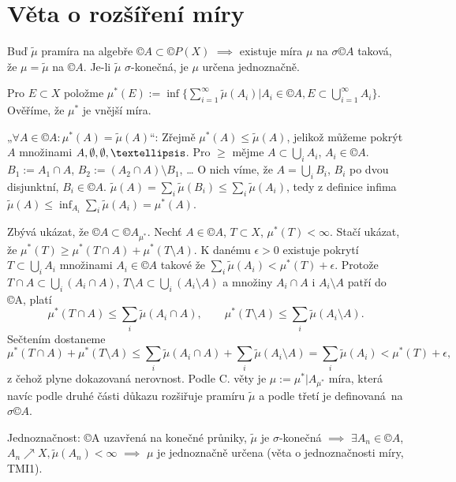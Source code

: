 \documentclass[12pt]{article}					%
\begin{document}
\section{Věta o rozšíření míry}
\begin{veta}
	Buď $\tilde{\mu}$ pramíra na algebře $©A \subset ©P(X)$ $\implies$ existuje míra $\mu$ na $\sigma©A$ taková, že $\mu = \tilde{\mu}$ na $©A$. Je-li $\tilde{\mu}$ $\sigma$-konečná, je $\mu$ určena jednoznačně.

	\begin{dukazin}
		Pro $E \subset X$ položme $\mu^*(E) := \inf\{\sum_{i=1}^∞ \tilde{\mu}(A_i) | A_i \in ©A, E \subset \bigcup_{i=1}^∞A_i\}$. Ověříme, že $\mu^*$ je vnější míra.

		„$\forall A \in ©A: \mu^*(A) = \tilde{\mu}(A)$“: Zřejmě $\mu^*(A) ≤ \tilde{\mu}(A)$, jelikož můžeme pokrýt $A$ množinami $A, \O, \O, …$. Pro $≥$ mějme $A \subset \bigcup_i A_i$, $A_i \in ©A$. $B_1:= A_1 \cap A$, $B_2 := (A_2 \cap A) \setminus B_1$, … O nich víme, že $A = \bigcup_i B_i$, $B_i$ po dvou disjunktní, $B_i \in ©A$. $\tilde{\mu}(A) = \sum_i\tilde{\mu}(B_i) ≤ \sum_i\tilde{\mu}(A_i)$, tedy z definice infima $\tilde{\mu}(A) ≤ \inf_{A_i}\sum_i \tilde{\mu}(A_i) = \mu^*(A)$.

		Zbývá ukázat, že $©A \subset ©A_{\mu^*}$. Nechť $A \in ©A$, $T \subset X$, $\mu^*(T) < ∞$. Stačí ukázat, že $\mu^*(T) ≥ \mu^*(T \cap A) + \mu^*(T \setminus A)$. K danému $\epsilon > 0$ existuje pokrytí $T \subset \bigcup_i A_i$ množinami $A_i \in ©A$ takové že $\sum_i \tilde \mu(A_i) < \mu^*(T) + \epsilon$. Protože $T \cap A \subset \bigcup_i(A_i \cap A)$, $T \setminus A \subset \bigcup_i(A_i \setminus A)$ a množiny $A_i \cap A$ i $A_i \setminus A$ patří do ©A, platí
		$$ \mu^*(T \cap A) ≤ \sum_i \tilde \mu(A_i \cap A), \qquad \mu^*(T \setminus A) ≤ \sum_i \tilde \mu(A_i \setminus A). $$
		Sečtením dostaneme
		$$ \mu^*(T \cap A) + \mu^*(T \setminus A) ≤ \sum_i \tilde \mu(A_i \cap A) + \sum_i \tilde\mu(A_i \setminus A) = \sum_i \tilde \mu(A_i) < \mu^*(T) + \epsilon, $$
		z čehož plyne dokazovaná nerovnost. Podle C. věty je $\mu := \mu^*|A_{\mu^*}$ míra, která navíc podle druhé části důkazu rozšiřuje pramíru $\tilde \mu$ a podle třetí je definovaná na $\sigma ©A$.

		Jednoznačnost: ©A uzavřená na konečné průniky, $\tilde{\mu}$ je $\sigma$-konečná $\implies$ $\exists A_n \in ©A$, $A_n \nearrow X, \tilde{\mu}(A_n) < ∞$ $\implies$ $\mu$ je jednoznačně určena (věta o jednoznačnosti míry, TMI1).
	\end{dukazin}
\end{veta}
\end{document}
